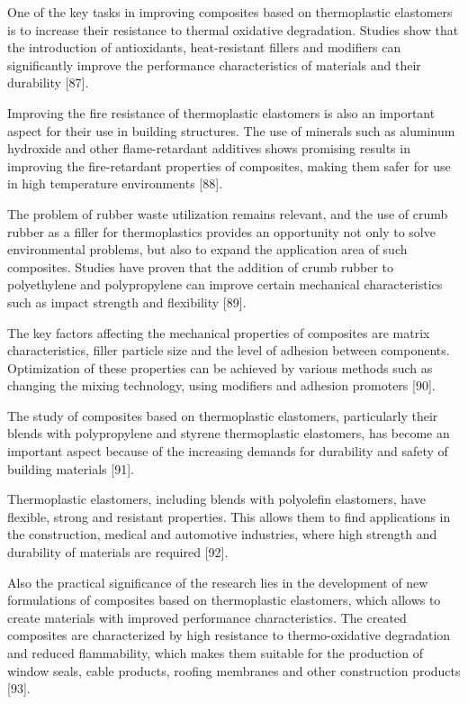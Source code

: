 One of the key tasks in improving composites based on thermoplastic
elastomers is to increase their resistance to thermal oxidative
degradation. Studies show that the introduction of antioxidants,
heat-resistant fillers and modifiers can significantly improve the
performance characteristics of materials and their durability {[}87{]}.

Improving the fire resistance of thermoplastic elastomers is also an
important aspect for their use in building structures. The use of
minerals such as aluminum hydroxide and other flame-retardant additives
shows promising results in improving the fire-retardant properties of
composites, making them safer for use in high temperature environments
{[}88{]}.

The problem of rubber waste utilization remains relevant, and the use of
crumb rubber as a filler for thermoplastics provides an opportunity not
only to solve environmental problems, but also to expand the application
area of such composites. Studies have proven that the addition of crumb
rubber to polyethylene and polypropylene can improve certain mechanical
characteristics such as impact strength and flexibility {[}89{]}.

The key factors affecting the mechanical properties of composites are
matrix characteristics, filler particle size and the level of adhesion
between components. Optimization of these properties can be achieved by
various methods such as changing the mixing technology, using modifiers
and adhesion promoters {[}90{]}.

The study of composites based on thermoplastic elastomers, particularly
their blends with polypropylene and styrene thermoplastic elastomers,
has become an important aspect because of the increasing demands for
durability and safety of building materials {[}91{]}.

Thermoplastic elastomers, including blends with polyolefin elastomers,
have flexible, strong and resistant properties. This allows them to find
applications in the construction, medical and automotive industries,
where high strength and durability of materials are required {[}92{]}.

Also the practical significance of the research lies in the development
of new formulations of composites based on thermoplastic elastomers,
which allows to create materials with improved performance
characteristics. The created composites are characterized by high
resistance to thermo-oxidative degradation and reduced flammability,
which makes them suitable for the production of window seals, cable
products, roofing membranes and other construction products {[}93{]}.

